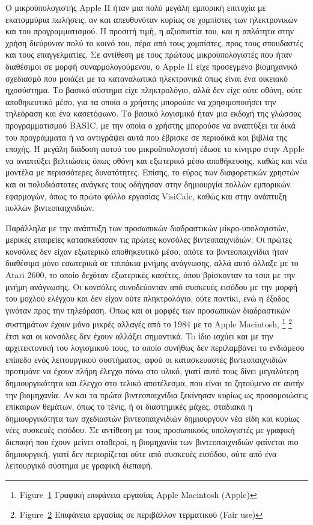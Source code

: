 \documentclass[
]{article}
\begin{document}
Ο μικροϋπολογιστής Apple II ήταν μια πολύ μεγάλη εμπορική επιτυχία με
εκατομμύρια πωλήσεις, αν και απευθυνόταν κυρίως σε χομπίστες των
ηλεκτρονικών και του προγραμματισμού. Η προσιτή τιμή, η αξιοπιστία του,
και η απλότητα στην χρήση διεύρυναν πολύ το κοινό του, πέρα από τους
χομπίστες, προς τους σπουδαστές και τους επαγγελματίες. Σε αντίθεση με
τους πρώτους μικροϋπολογιστές που ήταν διαθέσιμοι σε μορφή
συναρμολογούμενου, ο Apple II είχε προσεγμένο βιομηχανικό σχεδιασμό που
μοιάζει με τα καταναλωτικά ηλεκτρονικά όπως είναι ένα οικειακό
ηχοσύστημα. Το βασικό σύστημα είχε πληκτρολόγιο, αλλά δεν είχε ούτε
οθόνη, ούτε αποθηκευτικό μέσο, για τα οποία ο χρήστης μπορούσε να
χρησιμοποιήσει την τηλεόραση και ένα κασετόφωνο. Το βασικό λογισμικό
ήταν μια εκδοχή της γλώσσας προγραμματισμού BASIC, με την οποία ο
χρήστης μπορούσε να αναπτύξει τα δικά του προγράμματα ή να αντιγράψει
αυτά που έβρισκε σε περιοδικά και βιβλία της εποχής. Η μεγάλη διάδοση
αυτού του μικροϋπολογιστή έδωσε το κίνητρο στην Apple να αναπτύξει
βελτιώσεις όπως οθόνη και εξωτερικό μέσο αποθήκευσης, καθώς και νέα
μοντέλα με περισσότερες δυνατότητες. Επίσης, το εύρος των διαφορετικών
χρηστών και οι πολυδιάστατες ανάγκες τους οδήγησαν στην δημιουργία
πολλών εμπορικών εφαρμογών, όπως το πρώτο φύλλο εργασίας VisiCalc, καθώς
και στην ανάπτυξη πολλών βιντεοπαιχνιδιών.

Παράλληλα με την ανάπτυξη των προσωπικών διαδραστικών μίκρο-υπολογιστών,
μερικές εταιρείες κατασκεύασαν τις πρώτες κονσόλες βιντεοπαιχνιδιών. Οι
πρώτες κονσόλες δεν είχαν εξωτερικό αποθηκευτικό μέσο, οπότε τα
βιντεοπαιχνίδια ήταν διαθέσιμα μόνο εσωτερικά σε τσιπάκια μνήμης
ανάγνωσης, αλλά αυτό άλλαξε με το Atari 2600, το οποίο δεχόταν
εξωτερικές κασέτες, όπου βρίσκονταν τα τσιπ με την μνήμη ανάγνωσης. Οι
κονσόλες συνοδεύονταν από συσκευές εισόδου με την μορφή του μοχλού
ελέγχου και δεν είχαν ούτε πληκτρολόγιο, ούτε ποντίκι, ενώ η έξοδος
γινόταν προς την τηλεόραση. Όπως και οι μορφές των προσωπικών
διαδραστικών συστημάτων έχουν μόνο μικρές αλλαγές από το 1984 με το
Apple Macintosh, \footnote{Figure~\protect\hyperlink{fig:macintosh-desktop}{1}
  Γραφική επιφάνεια εργασίας Apple Macintosh (Apple)} \footnote{Figure~\protect\hyperlink{fig:tmux-desktop}{2}
  Επιφάνεια εργασίας σε περιβάλλον τερματικού (Fair use)} έτσι και οι
κονσόλες δεν έχουν αλλάξει σημαντικά. To ίδιο ισχύει και με την
αρχιτεκτονική του λογισμικού τους, το οποίο συνήθως δεν περιλαμβάνει το
ενδιάμεσο επίπεδο ενός λειτουργικού συστήματος, αφού οι κατασκευαστές
βιντεοπαιχνιδιών προτιμάνε να έχουν πλήρη έλεγχο πάνω στο υλικό, γιατί
αυτό τους δίνει μεγαλύτερη δημιουργικότητα και έλεγχο στο τελικό
αποτέλεσμα, που είναι το ζητούμενο σε αυτήν την βιομηχανία. Αν και τα
πρώτα βιντεοπαιχνίδια ξεκίνησαν κυρίως ως προσομοιώσεις επίκαιρων
θεμάτων, όπως το τένις, ή οι διαστημικές μάχες, σταδιακά η
δημιουργικότητα των σχεδιαστών βιντεοπαιχνιδιών δημιουργούν νέα είδη και
κυρίως νέες συσκευές εισόδου. Σε αντίθεση με τους προσωπικούς
υπολογιστές με γραφική διεπαφή που έχουν μείνει σταθεροί, η βιομηχανία
των βιντεοπαιχνιδιών φαίνεται πιο δημιουργική, γιατί δεν περιορίζεται
ούτε από συσκευές εισόδου, ούτε από ένα λειτουργικό σύστημα με γραφική
διεπαφή.
\end{document}
